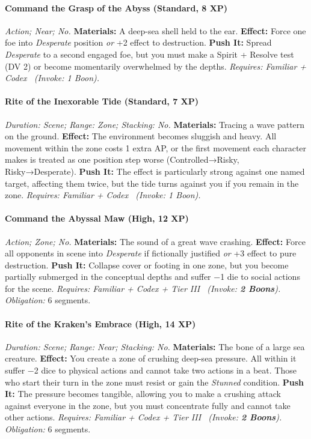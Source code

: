 \documentclass[12pt,twoside]{book}
\begin{document}
\paragraph{Command the Grasp of the Abyss (Standard, 8 XP)} \emph{Action; Near; No.}
\textbf{Materials:} A deep-sea shell held to the ear.
\textbf{Effect:} Force one foe into \emph{Desperate} position \emph{or} +2 effect to destruction.
\textbf{Push It:} Spread \emph{Desperate} to a second engaged foe, but you must make a Spirit + Resolve test (DV 2) or become momentarily overwhelmed by the depths.
\emph{Requires: Familiar + Codex \ (\textit{Invoke:} 1 Boon).}
\paragraph{Rite of the Inexorable Tide (Standard, 7 XP)} \emph{Duration: Scene; Range: Zone; Stacking: No.}
\textbf{Materials:} Tracing a wave pattern on the ground.
\textbf{Effect:} The environment becomes sluggish and heavy. All movement within the zone costs 1 extra AP, or the first movement each character makes is treated as one position step worse (Controlled→Risky, Risky→Desperate).
\textbf{Push It:} The effect is particularly strong against one named target, affecting them twice, but the tide turns against you if you remain in the zone.
\emph{Requires: Familiar + Codex \ (\textit{Invoke:} 1 Boon).}
\paragraph{Command the Abyssal Maw (High, 12 XP)} \emph{Action; Zone; No.}
\textbf{Materials:} The sound of a great wave crashing.
\textbf{Effect:} Force all opponents in scene into \emph{Desperate} if fictionally justified \emph{or} +3 effect to pure destruction.
\textbf{Push It:} Collapse cover or footing in one zone, but you become partially submerged in the conceptual depths and suffer −1 die to social actions for the scene.
\emph{Requires: Familiar + Codex + Tier III \ (\textit{Invoke:} \textbf{2 Boons}).}
\emph{Obligation:} 6 segments.

\paragraph{Rite of the Kraken's Embrace (High, 14 XP)} \emph{Duration: Scene; Range: Near; Stacking: No.}
\textbf{Materials:} The bone of a large sea creature.
\textbf{Effect:} You create a zone of crushing deep-sea pressure. All within it suffer −2 dice to physical actions and cannot take two actions in a beat. Those who start their turn in the zone must resist or gain the \emph{Stunned} condition.
\textbf{Push It:} The pressure becomes tangible, allowing you to make a crushing attack against everyone in the zone, but you must concentrate fully and cannot take other actions.
\emph{Requires: Familiar + Codex + Tier III \ (\textit{Invoke:} \textbf{2 Boons}).}
\emph{Obligation:} 6 segments.
\end{document}

